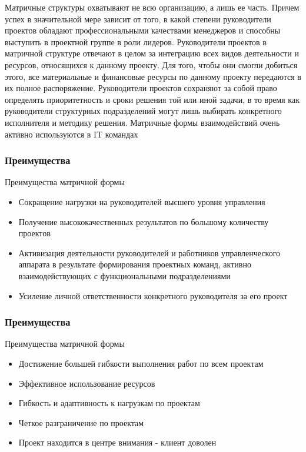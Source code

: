 \documentclass{../industrial-development}
\begin{document}
\begin{}
\begin{frame}
\end{frame}

\lecturenotes
Матричные структуры охватывают не всю организацию, а лишь ее часть. Причем успех в значительной мере зависит от того, в какой степени руководители проектов обладают профессиональными качествами менеджеров и способны выступить в проектной группе в роли лидеров.
Руководители проектов в матричной структуре отвечают в целом за интеграцию всех видов деятельности и ресурсов, относящихся к данному проекту. Для того, чтобы они смогли добиться этого, все материальные и финансовые ресурсы по данному проекту передаются в их полное распоряжение. Руководители проектов сохраняют за собой право определять приоритетность и сроки решения той или иной задачи, в то время как руководители структурных подразделений могут лишь выбирать конкретного исполнителя и методику решения.
Матричные формы взаимодействий очень активно используются в IT  командах

\begin{frame} \frametitle{Преимущества}
  \begin{block}{Преимущества матричной формы}
  \end{block}
  
  \begin{itemize}
  \item Сокращение нагрузки на руководителей высшего уровня управления 
  \item Получение высококачественных результатов по большому количеству проектов
  \item Активизация деятельности руководителей и работников управленческого аппарата в результате формирования проектных команд, активно взаимодействующих с функциональными подразделениями
  \item Усиление личной ответственности конкретного руководителя за его проект
  \end{itemize}
\end{frame}

\begin{frame} \frametitle{Преимущества}
  \begin{block}{Преимущества матричной формы}
  \end{block}
  
  \begin{itemize}
 \item Достижение большей гибкости выполнения работ по всем проектам
 \item Эффективное использование ресурсов
 \item Гибкость и адаптивность к нагрузкам по проектам
 \item Четкое разграничение по проектам
 \item Проект находится в центре внимания - клиент доволен
  \end{itemize}
\end{frame}


\end{}
\end{document}

